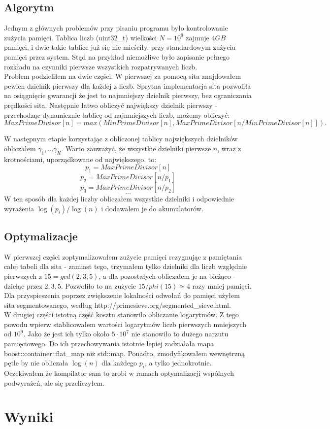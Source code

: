 \documentclass{report}
\begin{document}
\section*{Algorytm}
Jednym z głównych problemów przy pisaniu programu było kontrolowanie zużycia pamięci. Tablica liczb (uint32\_t) wielkości $N = 10^9$ zajmuje $4GB$ pamięci, i dwie takie tablice już się nie mieściły, przy standardowym zużyciu pamięci przez system.
Stąd na przykład niemożliwe było zapisanie pełnego rozkładu na czynniki pierwsze wszystkich rozpatrywanych liczb. \\

Problem podzieliłem na dwie części. W pierwszej za pomocą sita znajdowałem pewien dzielnik pierwszy dla każdej z liczb. Sprytna implementacja sita pozwoliła
na osiągnięcie gwarancji że jest to najmniejszy dzielnik pierwszy, bez ograniczania prędkości sita. Następnie łatwo obliczyć największy dzielnik pierwszy - przechodząc dynamicznie tablicę od najmniejszych liczb, możemy obliczyć:
$$ MaxPrimeDivisor[n] = max(MinPrimeDivisor[n], MaxPrimeDivisor[n/MinPrimeDivisor[n]]). $$

W następnym etapie korzystając z obliczonej tablicy największych dzielników obliczałem $\bar{\gamma}_1, \ldots \bar{\gamma}_K$. Warto zauważyć, że wszystkie dzielniki pierwsze $n$, wraz z krotnościami, uporządkowane od największego, to:
$$ p_1 = MaxPrimeDivisor[n] $$
$$ p_2 = MaxPrimeDivisor[n/p_1] $$
$$ p_3 = MaxPrimeDivisor[n/p_2] $$
$$ \ldots $$
W ten sposób dla każdej liczby obliczałem wszystkie dzielniki i odpowiednie wyrażenia $\log(p_i)/\log(n)$ i dodawałem je do akumulatorów.

\section*{Optymalizacje}

W pierwszej części zoptymalizowałem zużycie pamięci rezygnując z pamiętania całej tabeli dla sita - zamiast tego, trzymałem tylko dzielniki dla liczb względnie pierwszych z $15 = gcd(2, 3, 5)$,
a dla pozostałych obliczałem je na bieżąco - dzieląc przez $2, 3, 5$. Pozwoliło to na zużycie $15 / phi(15) \simeq 4$ razy mniej pamięci. Dla przyspieszenia poprzez zwiększenie lokalności odwołań do pamięci
użyłem sita segmentowanego, według http://primesieve.org/segmented\_sieve.html. \\

W drugiej części istotną część kosztu stanowiło obliczanie logarytmów. Z tego powodu wpierw stablicowałem wartości logarytmów liczb pierwszych mniejszych od $10^9$.
Jako że jest ich tylko około $5\cdot 10^7$ nie stanowiło to dużego narzutu pamięciowego. Do ich przechowywania istotnie lepiej zadziałała mapa boost::container::flat\_map niż std::map.
Ponadto, zmodyfikowałem wewnętrzną pętle by nie obliczała $\log(n)$ dla każdego $p_i$, a tylko jednokrotnie. Oczekiwałem że kompilator sam to zrobi w ramach optymalizacji wspólnych podwyrażeń, ale się przeliczyłem.

\chapter*{Wyniki}
\end{document}
